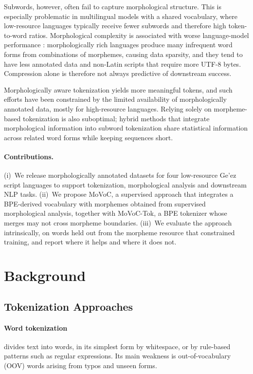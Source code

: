 \documentclass[11pt]{article}
\newcommand{\movoctok}{MoVoC-Tok}
\begin{document}
Subwords, however, often fail to capture morphological structure. This is
especially problematic in multilingual models with a shared vocabulary, where
low-resource languages typically receive fewer subwords and therefore high
token-to-word ratios. Morphological complexity is associated with worse
language-model performance \citep{park-etal-2021-morphology,
arnett-bergen-2025-language}: morphologically rich languages produce many
infrequent word forms from combinations of morphemes, causing data sparsity,
and they tend to have less annotated data and non-Latin scripts that require
more UTF-8 bytes. Compression alone is therefore not always predictive of
downstream success.

Morphologically aware tokenization yields more meaningful tokens, and such
efforts have been constrained by the limited availability of morphologically
annotated data, mostly for high-resource languages. Relying solely on
morpheme-based tokenization is also suboptimal; hybrid methods that integrate
morphological information into subword tokenization share statistical
information across related word forms while keeping sequences short.

\paragraph{Contributions.}
(i)~We release morphologically annotated datasets for four low-resource Ge'ez
script languages to support tokenization, morphological analysis and
downstream NLP tasks. (ii)~We propose MoVoC, a supervised approach that
integrates a BPE-derived vocabulary with morphemes obtained from supervised
morphological analysis, together with \movoctok{}, a BPE tokenizer whose
merges may not cross morpheme boundaries. (iii)~We evaluate the approach
intrinsically, on words held out from the morpheme resource that constrained
training, and report where it helps and where it does not.

\section{Background}
\label{sec:background}

\subsection{Tokenization Approaches}

\paragraph{Word tokenization} divides text into words, in its simplest form by
whitespace, or by rule-based patterns such as regular expressions. Its main
weakness is out-of-vocabulary (OOV) words arising from typos and unseen forms.
\end{document}
